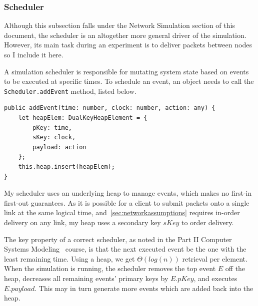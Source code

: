 \documentclass[12pt,a4paper,twoside,openright]{report}
\begin{document}
		
		\subsubsection{Scheduler}
		Although this subsection falls under the Network Simulation section of this document, the scheduler is an altogether more general driver of the simulation. However, its main task during an experiment is to deliver packets between nodes so I include it here.
		
		A simulation scheduler is responsible for mutating system state based on events to be executed at specific times. To schedule an event, an object needs to call the \lstinline|Scheduler.addEvent| method, listed below.
\begin{lstlisting}[caption=The Scheduler.addEvent method]
public addEvent(time: number, clock: number, action: any) {
    let heapElem: DualKeyHeapElement = {
        pKey: time,
        sKey: clock,
        payload: action
    };
    this.heap.insert(heapElem);
}
\end{lstlisting}

		My scheduler uses an underlying heap to manage events, which makes no first-in first-out guarantees. As it is possible for a client to submit packets onto a single link at the same logical time, and~\cref{sec:networkassumptions} requires in-order delivery on any link, my heap uses a secondary key $sKey$ to order delivery.
		
		The key property of a correct scheduler, as noted in the Part II Computer Systems Modeling~\cite[slide 120]{compsysmodeling} course, is that the next executed event be the one with the least remaining time. Using a heap, we get $\Theta (log(n))$ retrieval per element. When the simulation is running, the scheduler removes the top event $E$ off the heap, decreases all remaining events' primary keys by $E.pKey$, and executes $E.payload$. This may in turn generate more events which are added back into the heap.
		
\end{document}
